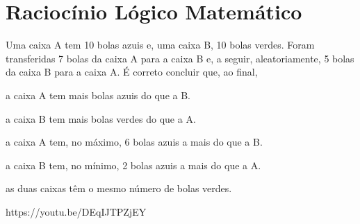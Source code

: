 \chapter{Raciocínio Lógico Matemático}

{Uma caixa A tem 10 bolas azuis e, uma caixa B, 10 bolas verdes. Foram transferidas 7 bolas da caixa A para a caixa B e, a seguir, aleatoriamente, 5 bolas da caixa B para a caixa A. É correto concluir que, ao final,}{
\item a caixa A tem mais bolas azuis do que a B.
\item a caixa B tem mais bolas verdes do que a A.
\item a caixa A tem, no máximo, 6 bolas azuis a mais do que a B.
\item a caixa B tem, no mínimo, 2 bolas azuis a mais do que a A.
\item as duas caixas têm o mesmo número de bolas verdes.}
{https://youtu.be/DEqIJTPZjEY}